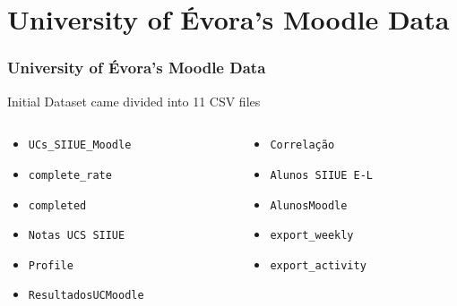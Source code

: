 \section{University of Évora's Moodle Data}

\begin{frame}
\frametitle{University of Évora's Moodle Data}

\centering
Initial Dataset came divided into 11 CSV files

\vspace{1cm}

\begin{columns}[T] %
\begin{column}{.48\textwidth}

\begin{itemize}
    \item \texttt{UCs\_SIIUE\_Moodle}
    \item \texttt{complete\_rate}
    \item \texttt{completed}
    \item \texttt{Notas UCS SIIUE}
    \item \texttt{Profile}
    \item \texttt{ResultadosUCMoodle}
\end{itemize}
\end{column}%
\hfill%
\begin{column}{.48\textwidth}

\begin{itemize}
    \item \texttt{Correlação}
    \item \texttt{Alunos SIIUE E-L}
    \item \texttt{AlunosMoodle}
    \item \texttt{export\_weekly}
    \item \texttt{export\_activity}
\end{itemize}
\end{column}%
\end{columns}
\end{frame}

